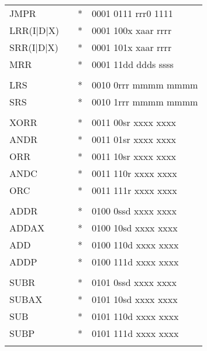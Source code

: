 \documentclass[oneside,english,a4paper,10pt,oneside,openany,final]{memoir}
\begin{document}
\begin{center}
\begin{longtable}{TllT}
JMPR        &          & *  & 0001 0111 rrr0 1111                     \\
LRR(I|D|X)  &          & *  & 0001 100x xaar rrrr                     \\
SRR(I|D|X)  &          & *  & 0001 101x xaar rrrr                     \\
MRR         &          & *  & 0001 11dd ddds ssss                     \\
            &          &    &                                         \\
LRS         &          & *  & 0010 0rrr mmmm mmmm                     \\
SRS         &          & *  & 0010 1rrr mmmm mmmm                     \\
            &          &    &                                         \\
XORR        &          & *  & 0011 00sr xxxx xxxx                     \\
ANDR        &          & *  & 0011 01sr xxxx xxxx                     \\
ORR         &          & *  & 0011 10sr xxxx xxxx                     \\
ANDC        &          & *  & 0011 110r xxxx xxxx                     \\
ORC         &          & *  & 0011 111r xxxx xxxx                     \\
            &          &    &                                         \\
ADDR        &          & *  & 0100 0ssd xxxx xxxx                     \\
ADDAX       &          & *  & 0100 10sd xxxx xxxx                     \\
ADD         &          & *  & 0100 110d xxxx xxxx                     \\
ADDP        &          & *  & 0100 111d xxxx xxxx                     \\
            &          &    &                                         \\
SUBR        &          & *  & 0101 0ssd xxxx xxxx                     \\
SUBAX       &          & *  & 0101 10sd xxxx xxxx                     \\
SUB         &          & *  & 0101 110d xxxx xxxx                     \\
SUBP        &          & *  & 0101 111d xxxx xxxx                     \\
            &          &    &                                         \\

\end{longtable}
\end{center}
\end{document}
